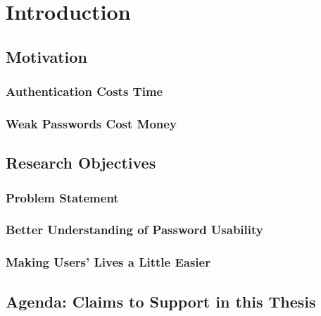 
\chapter[Introduction]{Introduction}\label{chap:intro}


\section{Motivation}
\subsection{Authentication Costs Time}
\subsection{Weak Passwords Cost Money}

\section{Research Objectives}
\subsection{Problem Statement}
\subsection{Better Understanding of Password Usability}
\subsection{Making Users' Lives a Little Easier}

\section{Agenda: Claims to Support in this Thesis}

